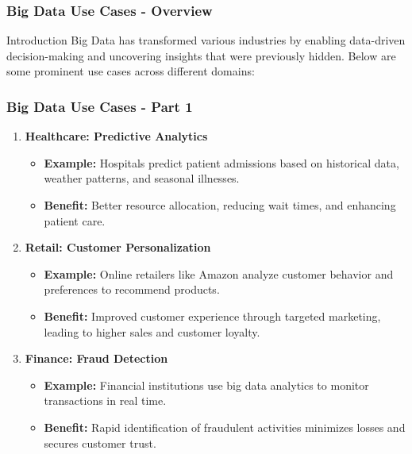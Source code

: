 \documentclass[aspectratio=169]{beamer}
\begin{document}
\begin{frame}[fragile]
    \frametitle{Big Data Use Cases - Overview}
    \begin{block}{Introduction}
        Big Data has transformed various industries by enabling data-driven decision-making and uncovering insights that were previously hidden. Below are some prominent use cases across different domains:
    \end{block}
\end{frame}

\begin{frame}[fragile]
    \frametitle{Big Data Use Cases - Part 1}
    \begin{enumerate}
        \item \textbf{Healthcare: Predictive Analytics}  
            \begin{itemize}
                \item \textbf{Example:} Hospitals predict patient admissions based on historical data, weather patterns, and seasonal illnesses.
                \item \textbf{Benefit:} Better resource allocation, reducing wait times, and enhancing patient care.
            \end{itemize}
          
        \item \textbf{Retail: Customer Personalization}  
            \begin{itemize}
                \item \textbf{Example:} Online retailers like Amazon analyze customer behavior and preferences to recommend products.
                \item \textbf{Benefit:} Improved customer experience through targeted marketing, leading to higher sales and customer loyalty.
            \end{itemize}
          
        \item \textbf{Finance: Fraud Detection}  
            \begin{itemize}
                \item \textbf{Example:} Financial institutions use big data analytics to monitor transactions in real time.
                \item \textbf{Benefit:} Rapid identification of fraudulent activities minimizes losses and secures customer trust.
            \end{itemize}
    \end{enumerate}
\end{frame}
\end{document}
